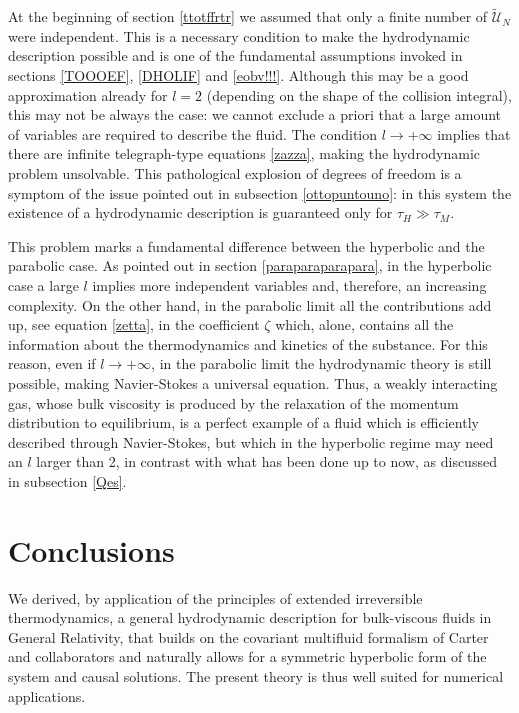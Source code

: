 \documentclass[useAMS,usenatbib,prd,twocolumn,nofootinbib]{revtex4-1}
\begin{document}
At the beginning of section \ref{ttotffrtr} we assumed that only a finite number of $\tilde{\mathcal{U}}_N$ were independent. This is a necessary condition to make the hydrodynamic description possible and is one of the fundamental assumptions invoked in sections \ref{TOOOEF}, \ref{DHOLIF} and \ref{eobv!!!}. 
Although this may be a good approximation already for $l=2$ (depending on the shape of the collision integral), this may not be always the case: we cannot exclude a priori that a large amount of variables are  required to describe the fluid. 
The condition $l \rightarrow + \infty$ implies that there are infinite telegraph-type equations \eqref{zazza}, making the hydrodynamic problem unsolvable. This pathological explosion of degrees of freedom is  a symptom of the issue pointed out in subsection \ref{ottopuntouno}: in this system the existence of a hydrodynamic description is guaranteed only for $\tau_H \gg \tau_M$.

This problem marks a fundamental difference between the hyperbolic and the parabolic case. 
As pointed out in section \ref{paraparaparapara}, in the hyperbolic case a large $l$ implies more independent variables and, therefore, an increasing complexity. 
On the other hand, in the parabolic limit all the contributions add up, see equation \eqref{zetta}, in the coefficient $\zeta$ which, alone, contains all the information about the thermodynamics and kinetics of the substance. For this reason, even if $l \rightarrow +\infty$, in the parabolic limit the hydrodynamic theory is still possible, making Navier-Stokes a universal equation. 
Thus, a weakly interacting gas, whose bulk viscosity is produced by the relaxation of the momentum distribution to equilibrium, is a perfect example of a fluid which is efficiently described through Navier-Stokes, but which in the hyperbolic regime may need an $l$ larger than 2, in contrast with what has been done up to now, as discussed in subsection \ref{Qes}.


\section{Conclusions}


We derived, by application of the principles of extended irreversible thermodynamics, a general hydrodynamic description for bulk-viscous fluids in General Relativity, that builds on the covariant multifluid formalism of Carter and collaborators \citep{carter1991, carter94, carter1995} and naturally allows for a symmetric hyperbolic form of the system \citep{Causality_bulk} and causal solutions. 
The present theory is thus well suited for numerical applications.
\end{document}
